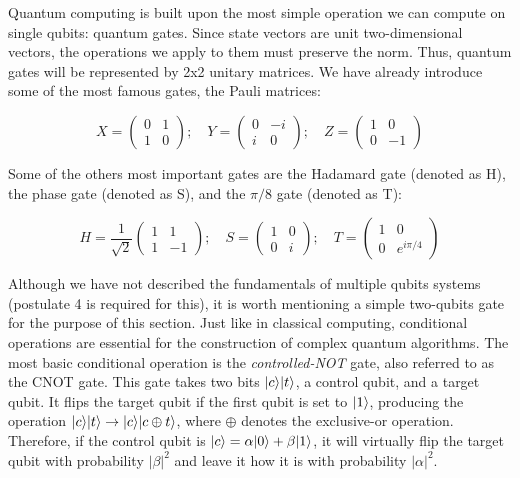 Quantum computing is built upon the most simple operation we can compute on single qubits: quantum gates. Since state vectors are unit two-dimensional vectors, the operations we apply to them must preserve the norm. Thus, quantum gates will be represented by 2x2 unitary matrices. We have already introduce some of the most famous gates, the Pauli matrices:

$$ X =
\begin{pmatrix}
	0 & 1 \\
	1 & 0 
\end{pmatrix}; \quad
Y =
\begin{pmatrix}
	0 & -i \\
	i & 0 
\end{pmatrix}; \quad
Z =
\begin{pmatrix}
	1 & 0 \\
	0 & -1 
\end{pmatrix}
$$

Some of the others most important gates are the Hadamard gate (denoted as H), the phase gate (denoted as S), and the $\pi/8$ gate (denoted as T):

$$ H = \frac{1}{\sqrt 2}
\begin{pmatrix}
	1 & 1 \\
	1 & -1 
\end{pmatrix}; \quad
S =
\begin{pmatrix}
	1 & 0 \\
	0 & i 
\end{pmatrix}; \quad
T =
\begin{pmatrix}
	1 & 0 \\
	0 & e^{i\pi/4} 
\end{pmatrix}
$$

Although we have not described the fundamentals of multiple qubits systems (postulate 4 is required for this), it is worth mentioning a simple two-qubits gate for the purpose of this section. Just like in classical computing, conditional operations are essential for the construction of complex quantum algorithms. The most basic conditional operation is the \emph{controlled-NOT} gate, also referred to as the CNOT gate. This gate takes two bits $|c\rangle|t\rangle$, a control qubit, and a target qubit. It flips the target qubit if the first qubit is set to $|1\rangle$, producing the operation $|c\rangle|t\rangle \rightarrow |c\rangle|c \oplus t\rangle$, where $\oplus$ denotes the exclusive-or operation. Therefore, if the control qubit is $|c\rangle = \alpha|0\rangle + \beta|1\rangle$, it will virtually flip the target qubit with probability $|\beta|^2$ and leave it how it is with probability $|\alpha|^2$.

